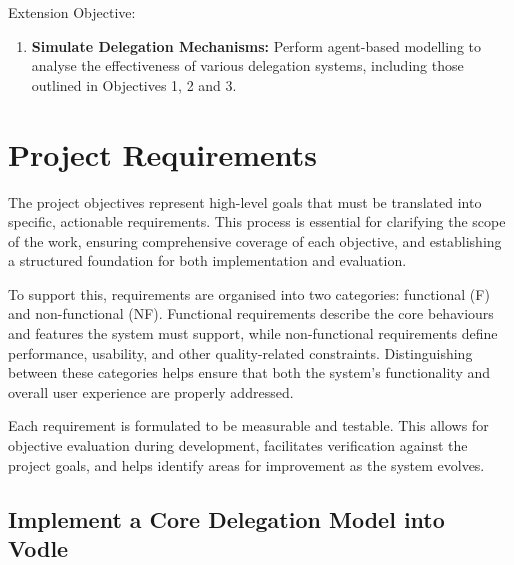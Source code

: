 Extension Objective:
\begin{enumerate}
    \item \textbf{Simulate Delegation Mechanisms: } Perform agent-based modelling to analyse the effectiveness of various delegation systems, including those outlined in Objectives 1, 2 and 3.
\end{enumerate}

\section{Project Requirements}
The project objectives represent high-level goals that must be translated into specific, actionable requirements. This process is essential for clarifying the scope of the work, ensuring comprehensive coverage of each objective, and establishing a structured foundation for both implementation and evaluation.

To support this, requirements are organised into two categories: functional (F) and non-functional (NF). Functional requirements describe the core behaviours and features the system must support, while non-functional requirements define performance, usability, and other quality-related constraints. Distinguishing between these categories helps ensure that both the system's functionality and overall user experience are properly addressed.

Each requirement is formulated to be measurable and testable. This allows for objective evaluation during development, facilitates verification against the project goals, and helps identify areas for improvement as the system evolves.

\subsection{Implement a Core Delegation Model into Vodle}
